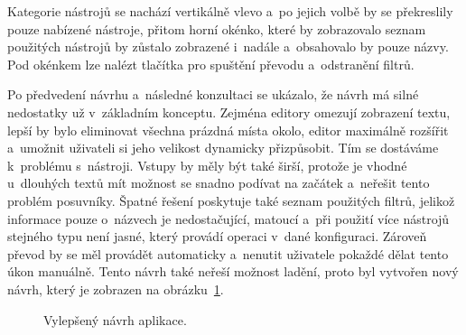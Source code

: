 Kategorie nástrojů se nachází vertikálně vlevo a~po jejich volbě by se překreslily pouze nabízené nástroje, přitom horní okénko, které by zobrazovalo seznam použitých nástrojů by zůstalo zobrazené i~nadále a~obsahovalo by pouze názvy. Pod okénkem lze nalézt tlačítka pro spuštění převodu a~odstranění filtrů.

Po předvedení návrhu a~následné konzultaci se ukázalo, že návrh má silné nedostatky už v~základním konceptu. Zejména editory omezují zobrazení textu, lepší by bylo eliminovat všechna prázdná místa okolo, editor maximálně rozšířit a~umožnit uživateli si jeho velikost dynamicky přizpůsobit. Tím se dostáváme k~problému s~nástroji. Vstupy by měly být také širší, protože je vhodné u~dlouhých textů mít možnost se snadno podívat na začátek a~neřešit tento problém posuvníky. Špatné řešení poskytuje také seznam použitých filtrů, jelikož informace pouze o~názvech je nedostačující, matoucí a~při použití více nástrojů stejného typu není jasné, který provádí operaci v~dané konfiguraci. Zároveň převod by se měl provádět automaticky a~nenutit uživatele pokaždé dělat tento úkon manuálně. Tento návrh také neřeší možnost ladění, proto byl vytvořen nový návrh, který je zobrazen na obrázku~\ref{obr:Vylepšený návrh}.
\begin{figure}[H]
	\centering
	\setlength{\fboxsep}{0pt}
	\caption{Vylepšený návrh aplikace.}
	\label{obr:Vylepšený návrh}
\end{figure}

